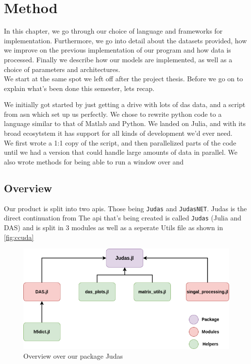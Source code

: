 \chapter{Method}
\label{chap:method}



In this chapter, we go through our choice of language and frameworks for implementation. Furthermore, we go into detail about the datasets provided, how we improve on the previous implementation of our program and how data is processed. Finally we describe how our models are implemented, as well as a choice of parameters and architectures. \\



We start at the same spot we left off after the project thesis. Before we go on to explain what's been done this semester, lets recap. 

We initially got started by just getting a drive with lots of \acrshort{das} data, and a script from \acrfull{asn} which set up us perfectly. We chose to rewrite python code to a language similar to that of Matlab and Python. We landed on Julia, and with its broad ecosytstem it has support for all kinds of development we'd ever need. \\

We first wrote a 1:1 copy of the script, and then parallelized parts of the code until we had a version that could handle large amounts of data in parallel. We also wrote methods for being able to run a window over and \\ 


\section{Overview}

Our product is split into two apis. Those being \texttt{Judas} and \texttt{JudasNET}. Judas is the direct continuation from \cite{projthesis}
The \acrshort{api} that's being created is called \texttt{Judas} (Julia and DAS) and is split in 3 modules as well as a seperate Utils file as shown in \ref{fig:ccuda}

\begin{figure}[h]
    \centering
    \includegraphics[scale=.6]{figures/judas_overview.png}
    \caption{Overview over our package Judas}
    \label{fig:judasoverview}
\end{figure}

